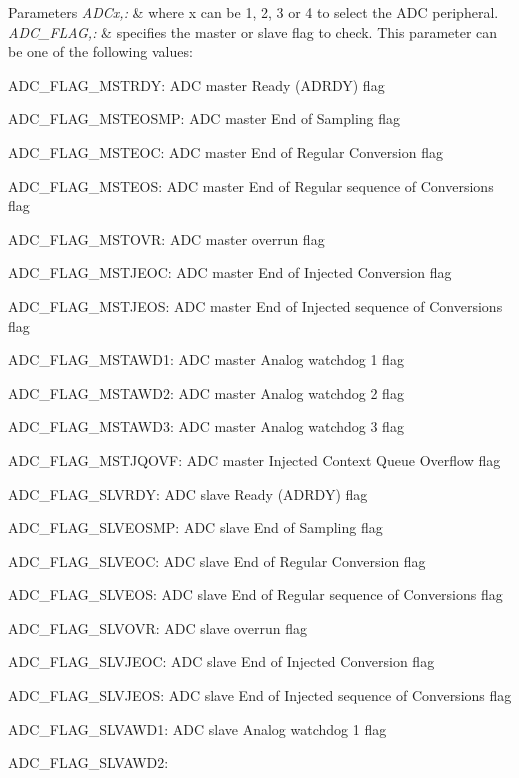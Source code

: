 \begin{DoxyParams}{Parameters}
{\em A\-D\-Cx,\-:} & where x can be 1, 2, 3 or 4 to select the A\-D\-C peripheral. \\
\hline
{\em A\-D\-C\-\_\-\-F\-L\-A\-G,\-:} & specifies the master or slave flag to check. This parameter can be one of the following values\-: \begin{DoxyItemize}
\item A\-D\-C\-\_\-\-F\-L\-A\-G\-\_\-\-M\-S\-T\-R\-D\-Y\-: A\-D\-C master Ready (A\-D\-R\-D\-Y) flag \item A\-D\-C\-\_\-\-F\-L\-A\-G\-\_\-\-M\-S\-T\-E\-O\-S\-M\-P\-: A\-D\-C master End of Sampling flag \item A\-D\-C\-\_\-\-F\-L\-A\-G\-\_\-\-M\-S\-T\-E\-O\-C\-: A\-D\-C master End of Regular Conversion flag \item A\-D\-C\-\_\-\-F\-L\-A\-G\-\_\-\-M\-S\-T\-E\-O\-S\-: A\-D\-C master End of Regular sequence of Conversions flag \item A\-D\-C\-\_\-\-F\-L\-A\-G\-\_\-\-M\-S\-T\-O\-V\-R\-: A\-D\-C master overrun flag \item A\-D\-C\-\_\-\-F\-L\-A\-G\-\_\-\-M\-S\-T\-J\-E\-O\-C\-: A\-D\-C master End of Injected Conversion flag \item A\-D\-C\-\_\-\-F\-L\-A\-G\-\_\-\-M\-S\-T\-J\-E\-O\-S\-: A\-D\-C master End of Injected sequence of Conversions flag \item A\-D\-C\-\_\-\-F\-L\-A\-G\-\_\-\-M\-S\-T\-A\-W\-D1\-: A\-D\-C master Analog watchdog 1 flag \item A\-D\-C\-\_\-\-F\-L\-A\-G\-\_\-\-M\-S\-T\-A\-W\-D2\-: A\-D\-C master Analog watchdog 2 flag \item A\-D\-C\-\_\-\-F\-L\-A\-G\-\_\-\-M\-S\-T\-A\-W\-D3\-: A\-D\-C master Analog watchdog 3 flag \item A\-D\-C\-\_\-\-F\-L\-A\-G\-\_\-\-M\-S\-T\-J\-Q\-O\-V\-F\-: A\-D\-C master Injected Context Queue Overflow flag \item A\-D\-C\-\_\-\-F\-L\-A\-G\-\_\-\-S\-L\-V\-R\-D\-Y\-: A\-D\-C slave Ready (A\-D\-R\-D\-Y) flag \item A\-D\-C\-\_\-\-F\-L\-A\-G\-\_\-\-S\-L\-V\-E\-O\-S\-M\-P\-: A\-D\-C slave End of Sampling flag \item A\-D\-C\-\_\-\-F\-L\-A\-G\-\_\-\-S\-L\-V\-E\-O\-C\-: A\-D\-C slave End of Regular Conversion flag \item A\-D\-C\-\_\-\-F\-L\-A\-G\-\_\-\-S\-L\-V\-E\-O\-S\-: A\-D\-C slave End of Regular sequence of Conversions flag \item A\-D\-C\-\_\-\-F\-L\-A\-G\-\_\-\-S\-L\-V\-O\-V\-R\-: A\-D\-C slave overrun flag \item A\-D\-C\-\_\-\-F\-L\-A\-G\-\_\-\-S\-L\-V\-J\-E\-O\-C\-: A\-D\-C slave End of Injected Conversion flag \item A\-D\-C\-\_\-\-F\-L\-A\-G\-\_\-\-S\-L\-V\-J\-E\-O\-S\-: A\-D\-C slave End of Injected sequence of Conversions flag \item A\-D\-C\-\_\-\-F\-L\-A\-G\-\_\-\-S\-L\-V\-A\-W\-D1\-: A\-D\-C slave Analog watchdog 1 flag \item A\-D\-C\-\_\-\-F\-L\-A\-G\-\_\-\-S\-L\-V\-A\-W\-D2\-: 
\end{DoxyItemize}
\end{DoxyParams}
